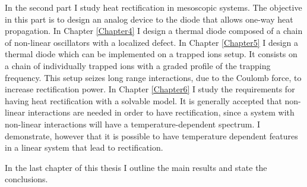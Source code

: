 In the second part I study heat rectification in mesoscopic systems. The objective in this part is to design an analog device to the diode that allows one-way heat propagation. In Chapter \ref{Chapter4} I design a thermal diode composed of a chain of non-linear oscillators with a localized defect. In Chapter \ref{Chapter5} I design a thermal diode which can be implemented on a trapped ions setup. It consists on a chain of individually trapped ions with a graded profile of the trapping frequency. This setup seizes long range interactions, due to the Coulomb force, to increase rectification power. In Chapter \ref{Chapter6} I study the requirements for having heat rectification with a solvable model. It is generally accepted that non-linear interactions are needed in order to have rectification, since a system with non-linear interactions will have a temperature-dependent spectrum. I demonstrate, however that it is possible to have temperature dependent features in a linear system that lead to rectification.

In the last chapter of this thesis I outline the main results and state the conclusions.
